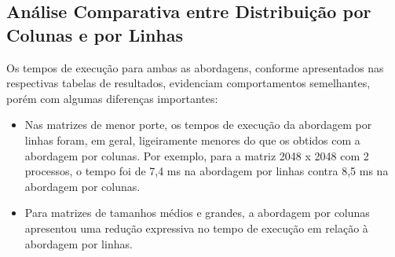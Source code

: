 \documentclass[a4paper, 12pt]{article}
\begin{document}
	\subsection{Análise Comparativa entre Distribuição por Colunas e por Linhas}
	Os tempos de execução para ambas as abordagens, conforme apresentados nas respectivas tabelas de resultados, evidenciam comportamentos semelhantes, porém com algumas diferenças importantes:
	
	\begin{itemize}
		\item Nas matrizes de menor porte, os tempos de execução da abordagem por linhas foram, em geral, ligeiramente menores do que os obtidos com a abordagem por colunas. Por exemplo, para a matriz 2048 x 2048 com 2 processos, o tempo foi de 7,4 ms na abordagem por linhas contra 8,5 ms na abordagem por colunas.
		
		\item Para matrizes de tamanhos médios e grandes, a abordagem por colunas apresentou uma redução expressiva no tempo de execução em relação à abordagem por linhas.
	\end{itemize}

	
	
\end{document}

